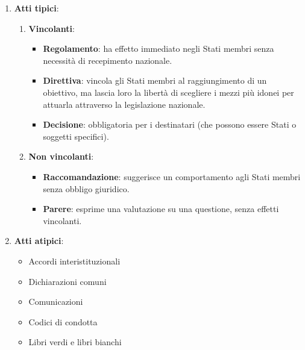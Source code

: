 \documentclass[8pt,oneside,a4paper]{article}
\begin{document}
	\begin{enumerate}
		\item \textbf{Atti tipici}:
		\begin{enumerate}
			\item \textbf{Vincolanti}:
			\begin{itemize}
				\item \textbf{Regolamento}: ha effetto immediato negli Stati membri senza necessità di recepimento nazionale.
				\item \textbf{Direttiva}: vincola gli Stati membri al raggiungimento di un obiettivo, ma lascia loro la libertà di scegliere i mezzi più idonei per attuarla attraverso la legislazione nazionale.
				\item \textbf{Decisione}: obbligatoria per i destinatari (che possono essere Stati o soggetti specifici).
			\end{itemize}
			\item \textbf{Non vincolanti}:
			\begin{itemize}
				\item \textbf{Raccomandazione}: suggerisce un comportamento agli Stati membri senza obbligo giuridico.
				\item \textbf{Parere}: esprime una valutazione su una questione, senza effetti vincolanti.
			\end{itemize}
		\end{enumerate}
		\item \textbf{Atti atipici}:  
		\begin{itemize}
			\item Accordi interistituzionali
			\item Dichiarazioni comuni
			\item Comunicazioni
			\item Codici di condotta
			\item Libri verdi e libri bianchi
		\end{itemize}
	\end{enumerate}
\end{document}
